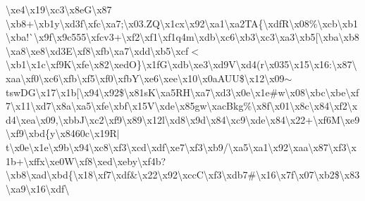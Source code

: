 \textbackslash{}xe4\textbackslash{}x19\textbackslash{}xc3\textbackslash{}x8e\+G\textbackslash{}x87 \textbackslash{}xb8+\textbackslash{}xb1y\textbackslash{}xd3f\textbackslash{}xfc\textbackslash{}xa7;\textbackslash{}x03.\+Z\+Q\textbackslash{}x1cx\textbackslash{}x92\textbackslash{}xa1\textbackslash{}xa2\+T\+A\{\textbackslash{}xdf\+R\textbackslash{}x08\%\textbackslash{}xcb\textbackslash{}xb1\textbackslash{}xba!\`{}\textbackslash{}x9f\textbackslash{}x9c555\textbackslash{}xfcv3+\textbackslash{}xf2\textbackslash{}xf1\textbackslash{}xf1q4m\textbackslash{}xdb\textbackslash{}xc6\textbackslash{}xb3\textbackslash{}xc3\textbackslash{}xa3\textbackslash{}xb5\mbox{[}\textbackslash{}xba\textbackslash{}xb8\textbackslash{}xa8\textbackslash{}xe8\textbackslash{}xd3\+E\textbackslash{}xf8\textbackslash{}xfb\textbackslash{}xa7\textbackslash{}xdd\textbackslash{}xb5\textbackslash{}xcf$<$\textbackslash{}xb1\textbackslash{}x1c\textbackslash{}xf9\+K\textbackslash{}xfe\textbackslash{}x82\textbackslash{}xed\+O\}\textbackslash{}x1f\+G\textbackslash{}xdb\textbackslash{}xe3\textbackslash{}xd9\+V\textbackslash{}xd4(r\textbackslash{}x035\textbackslash{}x15\textbackslash{}x16\+:\textbackslash{}x87\textbackslash{}xaa\textbackslash{}xf0\textbackslash{}xc6\textbackslash{}xfb\textbackslash{}xf5\textbackslash{}xf0\textbackslash{}xfb\+Y\textbackslash{}xe6\textbackslash{}xee\textbackslash{}x10\textbackslash{}x0a\+A\+U\+U\$\textbackslash{}x12\textbackslash{}x09$\sim$tsw\+D\+G\textbackslash{}x17\textbackslash{}x1b\mbox{[}\textbackslash{}x94\textbackslash{}x92\$\textbackslash{}x81s\+K\textbackslash{}xa5\+R\+H\textbackslash{}xa7\textbackslash{}xd3\textbackslash{}x0e\textbackslash{}x1e\#w\textbackslash{}x08\textbackslash{}xbc\textbackslash{}xbe\textbackslash{}xf7\textbackslash{}x11\textbackslash{}xd7\textbackslash{}x8a\textbackslash{}xa5\textbackslash{}xfe\textbackslash{}xbf\textbackslash{}x15\+V\textbackslash{}xde\textbackslash{}x85gw\textbackslash{}xac\+Bkg\%\textbackslash{}x8f\textbackslash{}x01\textbackslash{}x8c\textbackslash{}x84\textbackslash{}xf2\textbackslash{}xd4\textbackslash{}xea\textbackslash{}x09,\textbackslash{}xbb\+J\textbackslash{}xc2\textbackslash{}xf9\textbackslash{}x89\textbackslash{}x12l\textbackslash{}xd8\textbackslash{}x9d\textbackslash{}x84\textbackslash{}xc9\textbackslash{}xde\textbackslash{}x84\textbackslash{}x22+\textbackslash{}xf6\+M\textbackslash{}xe9\textbackslash{}xf9\textbackslash{}xbd\{y\textbackslash{}x8460c\textbackslash{}x19\+R$\vert$t\textbackslash{}x0e\textbackslash{}x1e\textbackslash{}x9b\textbackslash{}x94\textbackslash{}xc8\textbackslash{}xf3\textbackslash{}xcd\textbackslash{}xdf\textbackslash{}xe7\textbackslash{}xf3\textbackslash{}xb9/\textbackslash{}xa5\textbackslash{}xa1\textbackslash{}x92\textbackslash{}xaa\textbackslash{}x87\textquotesingle{}\textbackslash{}xf3\textbackslash{}x1b+\textbackslash{}xffx\textbackslash{}xe0\+W\textbackslash{}xf8\textbackslash{}xed\textbackslash{}xeby\textbackslash{}xf4b?\textbackslash{}xb8\textbackslash{}xad\textbackslash{}xbd\{\textbackslash{}x18\textbackslash{}xf7\textbackslash{}xdf\&\textbackslash{}x22\textbackslash{}x92\textbackslash{}xcc\+C\textbackslash{}xf3\textbackslash{}xdb7\#\textbackslash{}x16\textbackslash{}x7f\textbackslash{}x07\textbackslash{}xb2\$\textbackslash{}x83\textbackslash{}xa9\textbackslash{}x16\textbackslash{}xdf\textbackslash